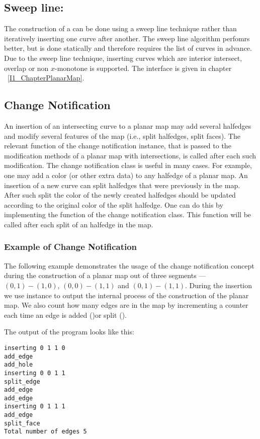 \subsection*{Sweep line:}
The construction of a  can be done using a sweep
line technique rather than iteratively inserting one curve after another.
The sweep line algorithm perfomrs better, but is done statically and therefore
requires the list of curves in advance.
Due to the sweep line technique, inserting curves which are interior intersect, 
overlap or non $x$-monotone is supported.
The interface is given in chapter  ~\ref{I1_ChapterPlanarMap}.


\begin{ccAdvanced}
\subsection*{Change Notification}
An insertion of an intersecting curve to a planar map may add
several halfedges and modify several features of the map (i.e.,
split halfedges, split faces). The relevant function of the change
notification instance, that is passed to the modification methods
of a planar map with intersections, is called after each such
modification. The change notification class is useful in many
cases. For example, one may add a color (or other extra data) to
any halfedge of a planar map. An insertion of a new curve can
split halfedges that were previously in the map. After such split
the color of the newly created halfedges should be updated
according to the original color of the split halfedge. One can do
this by implementing the  function of the change
notification class. This function will be called after each split
of an halfedge in the map.


\subsubsection{Example of Change Notification}
\label{ssecn:example2}
The following example demonstrates the usage of the change
notification concept during the construction of a
planar map out of three segments --- $(0,1)-(1,0)$, $(0,0)-(1,1)$
and $(0,1)-(1,1)$.
During the insertion we use  instance to
output the internal process of the construction of the planar map.
We also count how many edges are in the map by incrementing a
counter each time an edge is added ()or
split ().


The output of the program looks like this:
\begin{verbatim}
inserting 0 1 1 0
add_edge
add_hole
inserting 0 0 1 1
split_edge
add_edge
add_edge
inserting 0 1 1 1
add_edge
split_face
Total number of edges 5
\end{verbatim}

\end{ccAdvanced}



